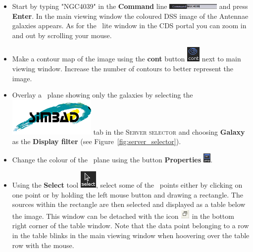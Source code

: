 \documentclass [a4paper, 12pt]{article}
\begin{document}
\begin{itemize}
    \item Start by typing "NGC4039" in the \textbf{Command} line
\includegraphics[width=0.2\textwidth]{../images/aladin_command_ngc4039.png}
and press \textbf{Enter}. In the main viewing window the coloured DSS image of
the Antennae galaxies appears. As for the \aladin\ lite window in the CDS
portal you can zoom in and out by scrolling your mouse.

    \item Make a contour map of the image using the \textbf{cont} button
\includegraphics[width=0.03  \textwidth]{../images/aladin_button_contours.png}
next to main viewing window. Increase the number of contours to better
represent the image.

    \item Overlay a \simbad\ plane showing only the galaxies by selecting
the \includegraphics[width=0.055  \textwidth]{../images/logo_simbad.png} tab
in
the
\textsc{Server selector} and choosing \textbf{Galaxy} as the \textbf{Display
filter} (see Figure~\ref{fig:server_selector}).

    \item Change the colour of the \simbad\ plane using the button
\textbf{Properties}
\includegraphics[width=0.03\textwidth]{../images/aladin_button_properties.png}.


    \item Using the \textbf{Select} tool \includegraphics[width=0.03
\textwidth]{../images/aladin_button_select.png}, select some of the \simbad\
points either by clicking on one point or by holding the left mouse button and
drawing a rectangle. The sources within the rectangle are then selected and
displayed as a table below the image. This window can be detached with the icon
\includegraphics[width=0.035
\textwidth]{../images/aladin_button_detach-table.png} in the bottom right
corner of the table window. Note that the data point
belonging to a row in the table blinks in the main viewing window when
hoovering over the table row with the mouse.


\end{itemize}
\end{document}
